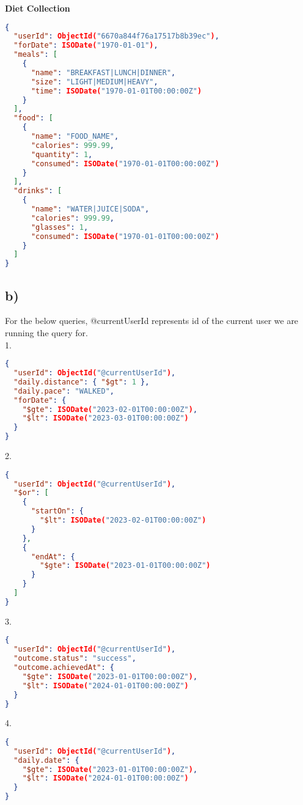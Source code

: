 \documentclass{article}
\begin{document}
\textbf{Diet Collection}
\begin{lstlisting}[language=json]
{
  "userId": ObjectId("6670a844f76a17517b8b39ec"),
  "forDate": ISODate("1970-01-01"),
  "meals": [
    {
      "name": "BREAKFAST|LUNCH|DINNER",
      "size": "LIGHT|MEDIUM|HEAVY",
      "time": ISODate("1970-01-01T00:00:00Z")
    }
  ],
  "food": [
    {
      "name": "FOOD_NAME",
      "calories": 999.99,
      "quantity": 1,
      "consumed": ISODate("1970-01-01T00:00:00Z")
    }
  ],
  "drinks": [
    {
      "name": "WATER|JUICE|SODA",
      "calories": 999.99,
      "glasses": 1,
      "consumed": ISODate("1970-01-01T00:00:00Z")
    }
  ]
}
\end{lstlisting} 
\pagebreak
\subsection*{\small b)}
For the below queries, @currentUserId represents id of the current user we are running the query for. \\
\newline
\hspace{0cm}1.
\begin{lstlisting}[language=json]
{ 
  "userId": ObjectId("@currentUserId"), 
  "daily.distance": { "$gt": 1 }, 
  "daily.pace": "WALKED",
  "forDate": {
    "$gte": ISODate("2023-02-01T00:00:00Z"),
    "$lt": ISODate("2023-03-01T00:00:00Z")
  }
}
\end{lstlisting} 
\hspace{0cm}2.
\begin{lstlisting}[language=json]
{
  "userId": ObjectId("@currentUserId"),
  "$or": [
    {
      "startOn": {
        "$lt": ISODate("2023-02-01T00:00:00Z")
      }
    },
    {
      "endAt": {
        "$gte": ISODate("2023-01-01T00:00:00Z")
      }
    }
  ]
}
\end{lstlisting}
\hspace{0cm}3. 
\begin{lstlisting}[language=json]
{
  "userId": ObjectId("@currentUserId"),
  "outcome.status": "success",
  "outcome.achievedAt": {
    "$gte": ISODate("2023-01-01T00:00:00Z"),
    "$lt": ISODate("2024-01-01T00:00:00Z")
  }
}
\end{lstlisting}
\hspace{0cm}4. 
\begin{lstlisting}[language=json]
{
  "userId": ObjectId("@currentUserId"),
  "daily.date": {
    "$gte": ISODate("2023-01-01T00:00:00Z"),
    "$lt": ISODate("2024-01-01T00:00:00Z")
  }
}
\end{lstlisting}
\end{document}
